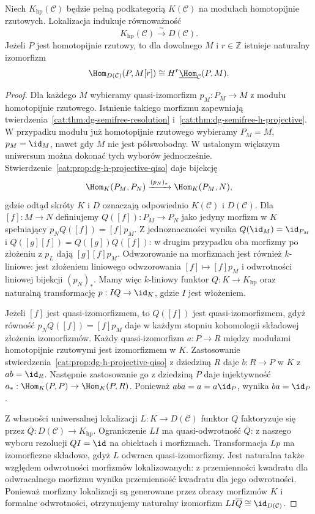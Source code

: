 \begin{twierdzenie}\label{cat:thm:dg-derived-h-projective}
Niech $K_{\mathrm{hp}}(\mathcal C)$ będzie pełną podkategorią $K(\mathcal C)$ na modułach homotopijnie rzutowych. Lokalizacja indukuje równoważność
\[
 K_{\mathrm{hp}}(\mathcal C)\xrightarrow{\ \sim\ }D(\mathcal C).
\]
Jeżeli $P$ jest homotopijnie rzutowy, to dla dowolnego $M$ i $r\in\mathbb Z$ istnieje naturalny izomorfizm
\[
 \Hom_{D(\mathcal C)}(P,M[r])
 \cong H^r\underline{\Hom}_{\mathcal C}(P,M).
\]
\end{twierdzenie}
\begin{proof}
Dla każdego $M$ wybieramy quasi-izomorfizm $p_M:P_M\to M$ z modułu homotopijnie rzutowego. Istnienie takiego morfizmu zapewniają twierdzenia~\ref{cat:thm:dg-semifree-resolution} i~\ref{cat:thm:dg-semifree-h-projective}. W przypadku modułu już homotopijnie rzutowego wybieramy $P_M=M$, $p_M=\id_M$, nawet gdy $M$ nie jest półswobodny. W ustalonym większym uniwersum można dokonać tych wyborów jednocześnie. Stwierdzenie~\ref{cat:prop:dg-h-projective-qiso} daje bijekcję
\[
 \Hom_K(P_M,P_N)\xrightarrow{(p_N)_*}\Hom_K(P_M,N),
\]
gdzie odtąd skróty $K$ i $D$ oznaczają odpowiednio $K(\mathcal C)$ i $D(\mathcal C)$. Dla $[f]:M\to N$ definiujemy $Q([f]):P_M\to P_N$ jako jedyny morfizm w $K$ spełniający $p_N Q([f])=[f]p_M$. Z jednoznaczności wynika $Q(\id_M)=\id_{P_M}$ i $Q([g][f])=Q([g])Q([f])$: w drugim przypadku oba morfizmy po złożeniu z $p_L$ dają $[g][f]p_M$. Odwzorowanie na morfizmach jest również $k$-liniowe: jest złożeniem liniowego odwzorowania $[f]\mapsto [f]p_M$ i odwrotności liniowej bijekcji $(p_N)_*$. Mamy więc $k$-liniowy funktor $Q:K\to K_{\mathrm{hp}}$ oraz naturalną transformację $p:IQ\to\id_K$, gdzie $I$ jest włożeniem.

Jeżeli $[f]$ jest quasi-izomorfizmem, to $Q([f])$ jest quasi-izomorfizmem, gdyż równość $p_N Q([f])=[f]p_M$ daje w każdym stopniu kohomologii składowej złożenia izomorfizmów. Każdy quasi-izomorfizm $a:P\to R$ między modułami homotopijnie rzutowymi jest izomorfizmem w $K$. Zastosowanie stwierdzenia~\ref{cat:prop:dg-h-projective-qiso} z dziedziną $R$ daje $b:R\to P$ w $K$ z $ab=\id_R$. Następnie zastosowanie go z dziedziną $P$ daje injektywność $a_*:\Hom_K(P,P)\to\Hom_K(P,R)$. Ponieważ $aba=a=a\id_P$, wynika $ba=\id_P$.

Z własności uniwersalnej lokalizacji $L:K\to D(\mathcal C)$ funktor $Q$ faktoryzuje się przez $\overline Q:D(\mathcal C)\to K_{\mathrm{hp}}$. Ograniczenie $LI$ ma quasi-odwrotność $\overline Q$: z naszego wyboru rezolucji $QI=\id$ na obiektach i morfizmach. Transformacja $Lp$ ma izomorficzne składowe, gdyż $L$ odwraca quasi-izomorfizmy. Jest naturalna także względem odwrotności morfizmów lokalizowanych: z przemienności kwadratu dla odwracalnego morfizmu wynika przemienność kwadratu dla jego odwrotności. Ponieważ morfizmy lokalizacji są generowane przez obrazy morfizmów $K$ i formalne odwrotności, otrzymujemy naturalny izomorfizm $LI\overline Q\cong\id_{D(\mathcal C)}$.


\end{proof}
